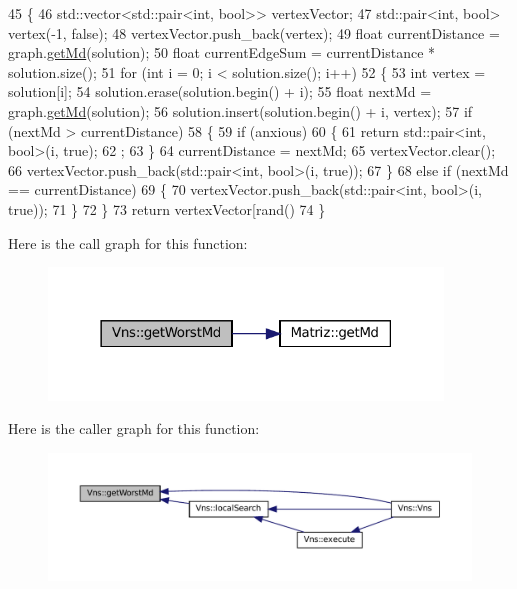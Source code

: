 \begin{DoxyCode}
45 \{
46   std::vector<std::pair<int, bool>> vertexVector;
47   std::pair<int, bool> vertex(-1, \textcolor{keyword}{false});
48   vertexVector.push\_back(vertex);
49   \textcolor{keywordtype}{float} currentDistance = graph.\hyperlink{classMatriz_a8df14a27d791f24206dd633b2a685c5b}{getMd}(solution);
50   \textcolor{keywordtype}{float} currentEdgeSum = currentDistance * solution.size();
51   \textcolor{keywordflow}{for} (\textcolor{keywordtype}{int} i = 0; i < solution.size(); i++)
52   \{
53     \textcolor{keywordtype}{int} vertex = solution[i];
54     solution.erase(solution.begin() + i);
55     \textcolor{keywordtype}{float} nextMd = graph.\hyperlink{classMatriz_a8df14a27d791f24206dd633b2a685c5b}{getMd}(solution);
56     solution.insert(solution.begin() + i, vertex);
57     \textcolor{keywordflow}{if} (nextMd > currentDistance)
58     \{
59       \textcolor{keywordflow}{if} (anxious)
60       \{
61         \textcolor{keywordflow}{return} std::pair<int, bool>(i, \textcolor{keyword}{true});
62         ;
63       \}
64       currentDistance = nextMd;
65       vertexVector.clear();
66       vertexVector.push\_back(std::pair<int, bool>(i, \textcolor{keyword}{true}));
67     \}
68     \textcolor{keywordflow}{else} \textcolor{keywordflow}{if} (nextMd == currentDistance)
69     \{
70       vertexVector.push\_back(std::pair<int, bool>(i, \textcolor{keyword}{true}));
71     \}
72   \}
73   \textcolor{keywordflow}{return} vertexVector[rand() %
74 \}
\end{DoxyCode}
Here is the call graph for this function\+:
\nopagebreak
\begin{figure}[H]
\begin{center}
\leavevmode
\includegraphics[width=297pt]{classVns_a2349cd809a0925058a35dea1722c7c23_cgraph}
\end{center}
\end{figure}
Here is the caller graph for this function\+:
\nopagebreak
\begin{figure}[H]
\begin{center}
\leavevmode
\includegraphics[width=350pt]{classVns_a2349cd809a0925058a35dea1722c7c23_icgraph}
\end{center}
\end{figure}
\mbox{\label{classVns_aea2dfebed6019c61f7b7405e198d50ab}} 
